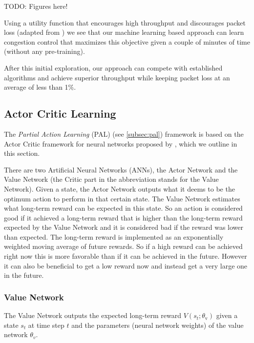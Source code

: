 \documentclass[sigconf]{acmart}
\newcommand\note[2]{{\color{#1}#2}}
\newcommand\todo[1]{{\note{red}{TODO: #1}}}
\begin{document}
\todo{Figures here!}

Using a utility function that encourages high throughput and discourages packet loss (adapted from \citep{dong_pcc:_2015}) we see that our machine learning based approach can learn congestion control that maximizes this objective given a couple of minutes of time (without any pre-training). 

After this initial exploration, our approach can compete with established algorithms and achieve superior throughput while keeping packet loss at an average of less than 1\%. 

\subsection{Actor Critic Learning}
\label{subsec:ac}

The \textit{Partial Action Learning} (PAL) (see \ref{subsec:pal}) framework is based on the Actor Critic framework for neural networks proposed by \citet{mnih_asynchronous_2016}, which we outline in this section. 

There are two Artificial Neural Networks (ANNs), the Actor Network and the Value Network (the Critic part in the abbreviation stands for the Value Network). Given a state, the Actor Network outputs what it deems to be the optimum action to perform in that certain state. The Value Network estimates what long-term reward can be expected in this state. So an action is considered good if it achieved a long-term reward that is higher than the long-term reward expected by the Value Network and it is considered bad if the reward was lower than expected. The long-term reward is implemented as an exponentially weighted moving average of future rewards. So if a high reward can be achieved right now this is more favorable than if it can be achieved in the future. However it can also be beneficial to get a low reward now and instead get a very large one in the future. 

\subsubsection{Value Network}
\label{subsubsec:genericvalue}

The Value Network outputs the expected long-term reward $V(s_{t}; \theta_\text{v})$ given a state $s_t$ at time step $t$ and the parameters (neural network weights) of the value network $\theta_v$.
\end{document}
